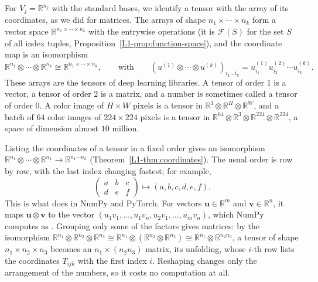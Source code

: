 For $V_j = \mathbb{R}^{n_j}$ with the standard bases, we identify a tensor with the array of its coordinates, as we did for matrices. The arrays of shape $n_1 \times \cdots \times n_k$ form a vector space $\mathbb{R}^{n_1 \times \cdots \times n_k}$ with the entrywise operations (it is $\mathcal{F}(S)$ for the set $S$ of all index tuples, Proposition~\ref{L1-prop:function-space}), and the coordinate map is an isomorphism
\[\mathbb{R}^{n_1} \otimes \cdots \otimes \mathbb{R}^{n_k} \cong \mathbb{R}^{n_1 \times \cdots \times n_k}, \qquad \text{with} \qquad (u^{(1)} \otimes \cdots \otimes u^{(k)})_{i_1 \ldots i_k} = u^{(1)}_{i_1} u^{(2)}_{i_2} \cdots u^{(k)}_{i_k}.\]
These arrays are the tensors of deep learning libraries. A tensor of order $1$ is a vector, a tensor of order $2$ is a matrix, and a number is sometimes called a tensor of order $0$. A color image of $H \times W$ pixels is a tensor in $\mathbb{R}^3 \otimes \mathbb{R}^H \otimes \mathbb{R}^W$, and a batch of $64$ color images of $224 \times 224$ pixels is a tensor in $\mathbb{R}^{64} \otimes \mathbb{R}^3 \otimes \mathbb{R}^{224} \otimes \mathbb{R}^{224}$, a space of dimension almost $10$ million.

\begin{example}[Reshaping]\label{L1-ex:reshape}
    Listing the coordinates of a tensor in a fixed order gives an isomorphism $\mathbb{R}^{n_1} \otimes \cdots \otimes \mathbb{R}^{n_k} \to \mathbb{R}^{n_1 \cdots n_k}$ (Theorem~\ref{L1-thm:coordinates}). The usual order is row by row, with the last index changing fastest; for example,
    \[\begin{pmatrix} a & b & c \\ d & e & f \end{pmatrix} \mapsto (a, b, c, d, e, f).\]
    This is what  does in NumPy and PyTorch. For vectors $\mathbf{u} \in \mathbb{R}^m$ and $\mathbf{v} \in \mathbb{R}^n$, it maps $\mathbf{u} \otimes \mathbf{v}$ to the vector $(u_1v_1, \ldots, u_1v_n, u_2v_1, \ldots, u_mv_n)$, which NumPy computes as . Grouping only some of the factors gives matrices: by the isomorphism $\mathbb{R}^{n_1} \otimes \mathbb{R}^{n_2} \otimes \mathbb{R}^{n_3} \cong \mathbb{R}^{n_1} \otimes (\mathbb{R}^{n_2} \otimes \mathbb{R}^{n_3}) \cong \mathbb{R}^{n_1} \otimes \mathbb{R}^{n_2n_3}$, a tensor of shape $n_1 \times n_2 \times n_3$ becomes an $n_1 \times (n_2n_3)$ matrix, its unfolding, whose $i$-th row lists the coordinates $T_{ijk}$ with the first index $i$. Reshaping changes only the arrangement of the numbers, so it costs no computation at all.
\end{example}

